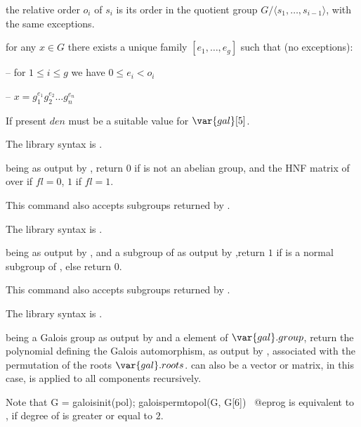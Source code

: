 \quad\item the relative order $o_i$ of $s_i$ is its order in the
quotient group $G/\langle s_1,\ldots,s_{i-1}\rangle$, with the same
exceptions.

\quad\item for any $x\in G$ there exists a unique family
$[e_1,\ldots,e_g]$ such that (no exceptions):

-- for $1\leq i \leq g$ we have $0\leq e_i<o_i$

-- $x=g_1^{e_1}g_2^{e_2}\ldots g_n^{e_n}$

If present $den$ must be a suitable value for $\var{gal}[5]$.

The library syntax is .

\label{se:galoisisabelian}
 being as output by , return $0$ if
 is not an abelian group, and the HNF matrix of  over
 if $fl=0$, $1$ if $fl=1$.

This command also accepts subgroups returned by .

The library syntax is .

\label{se:galoisisnormal}
 being as output by , and  a subgroup
of  as output by ,return $1$ if  is a
normal subgroup of , else return 0.

This command also accepts subgroups returned by .

The library syntax is .

\label{se:galoispermtopol}
 being a
Galois group as output by  and  a element of
$\var{gal}.group$, return the polynomial defining the Galois
automorphism, as output by , associated with the
permutation  of the roots $\var{gal}.roots$.  can
also be a vector or matrix, in this case,  is
applied to all components recursively.

\noindent Note that
\bprog
G = galoisinit(pol);
galoispermtopol(G, G[6])~
@eprog\noindent
is equivalent to , if degree of  is greater
or equal to $2$.

